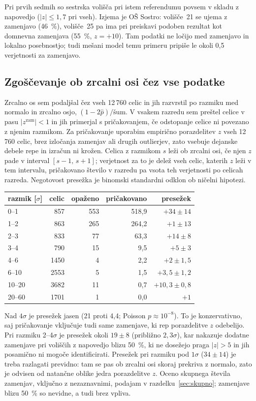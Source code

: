 \documentclass[11pt,a4paper]{article}
\begin{document}
Pri prvih sedmih so sestrska volišča pri istem referendumu povsem v skladu z napovedjo ($|z|\leq1{,}7$ pri vseh). Izjema je OŠ Sostro: volišče~21 se ujema z zamenjavo (46~\%), volišče~25 pa ima pri preiskavi podoben rezultat kot domnevna zamenjava (55~\%, $z=+10$). Tam podatki ne ločijo med zamenjavo in lokalno posebnostjo; tudi mešani model temu primeru pripiše le okoli 0,5 verjetnosti za zamenjavo.

\subsection{Zgoščevanje ob zrcalni osi čez vse podatke}\label{sec:zrcalnaos}

Zrcalno os sem podaljšal čez vseh 12\,760 celic in jih razvrstil po razmiku med normalo in zrcalno osjo, $(1-2\hat p)/\text{šum}$. V vsakem razredu sem preštel celice v pasu $|z^{\text{zam}}|<1$ in jih primerjal s pričakovanjem, če odstopanje celice ni povezano z njenim razmikom. Za pričakovanje uporabim empirično porazdelitev $z$ vseh 12\,760 celic, brez izločanja zamenjav ali drugih outlierjev, zato vsebuje dejanske debele repe in izračun ni krožen. Celica z razmikom $s$ leži ob zrcalni osi, če njen $z$ pade v interval $[s-1,\,s+1]$; verjetnost za to je delež vseh celic, katerih $z$ leži v tem intervalu, pričakovano število v razredu pa vsota teh verjetnosti po celicah razreda. Negotovost presežka je binomski standardni odklon ob ničelni hipotezi.

\begin{center}
\begin{tabular}{lrrrr}
\toprule
razmik [$\sigma$] & celic & opaženo & pričakovano & presežek \\
\midrule
0--1 & 857 & 553 & 518,9 & $+34\pm14$ \\
1--2 & 863 & 265 & 264,2 & $+1\pm13$ \\
2--3 & 833 & 77 & 63,3 & $+14\pm8$ \\
3--4 & 790 & 15 & 9,5 & $+5\pm3$ \\
4--6 & 1450 & 4 & 2,2 & $+2\pm1{,}5$ \\
6--10 & 2553 & 5 & 1,5 & $+3{,}5\pm1{,}2$ \\
10--20 & 3682 & 11 & 0,7 & $+10{,}3\pm0{,}8$ \\
20--60 & 1701 & 1 & 0,0 & $+1$ \\
\bottomrule
\end{tabular}
\end{center}

Nad $4\sigma$ je presežek jasen (21 proti 4,4; Poisson $p\approx10^{-8}$). To je konzervativno, saj pričakovanje vključuje tudi same zamenjave, ki rep porazdelitve $z$ odebelijo. Pri razmiku 2--4$\sigma$ je presežek okoli $19\pm8$ (približno $2{,}3\sigma$), kar nakazuje dodatne zamenjave pri voliščih z napovedjo blizu 50~\%, ki ne dosežejo praga $|z|>5$ in jih posamično ni mogoče identificirati. Presežek pri razmiku pod $1\sigma$ ($34\pm14$) je treba razlagati previdno: tam se pas ob zrcalni osi skoraj prekriva z normalo, zato je odvisen od natančne oblike jedra porazdelitve $z$. Oceno skupnega števila zamenjav, vključno z nezaznavnimi, podajam v razdelku~\ref{sec:skupno}; zamenjave blizu 50~\% so nevidne, a tudi brez vpliva.
\end{document}
